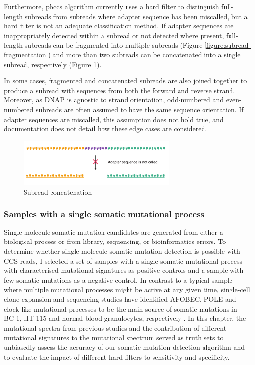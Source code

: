 Furthermore, pbccs algorithm currently uses a hard filter to distinguish full-length subreads from subreads where adapter sequence has been miscalled, but a hard filter is not an adequate classification method.  If adapter sequences are inappropriately detected within a subread or not detected where present, full-length subreads can be fragmented into multiple subreads (Figure \ref{figure:subread-fragmentation}) and more than two subreads can be concatenated into a single subread, respectively (Figure \ref{figure:subread-concatenation}).

In some cases, fragmented and concatenated subreads are also joined together to produce a subread with sequences from both the forward and reverse strand. Moreover, as DNAP is agnostic to strand orientation, odd-numbered and even-numbered subreads are often assumed to have the same sequence orientation. If adapter sequences are miscalled, this assumption does not hold true, and documentation does not detail how these edge cases are considered.

\begin{figure}[htbp!]
\caption{Subread concatenation }
\label{figure:subread-concatenation}
\begin{centering}
\includegraphics[width=0.7\textwidth]{Vector/subread_concatenation.pdf}
\end{centering}
\end{figure}

\subsubsection{Samples with a single somatic mutational process}

Single molecule somatic mutation candidates are generated from either a biological process or from library, sequencing, or bioinformatics errors. To determine whether single molecule somatic mutation detection is possible with CCS reads, I selected a set of samples with a single somatic mutational process with characterised mutational signatures as positive controls and a sample with few somatic mutations as a negative control. In contrast to a typical sample where multiple mutational processes might be active at any given time, single-cell clone expansion and sequencing studies have identified APOBEC, POLE and clock-like mutational processes to be the main source of somatic mutations in BC-1, HT-115 and normal blood granulocytes, respectively \cite{Mitchell2022-ry, Petljak2019-wi}. In this chapter, the mutational spectra from previous studies and the contribution of different mutational signatures to the mutational spectrum served as truth sets to unbiasedly assess the accuracy of our somatic mutation detection algorithm and to evaluate the impact of different hard filters to sensitivity and specificity.

